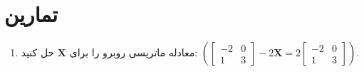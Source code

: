 \section{\textbf{تمارین}}
\label{sec:2.10}
{
    \Large
    \begin{spacing}{1.5}
        \begin{enumerate}[label=\textbf{\arabic*}.]
            \item {معادله ماتریسی روبرو را برای $\textbf{X}$ حل کنید: $\left( \begin{bmatrix}
                                                                                  -2 & 0 \\
                                                                                  1  & 3
            \end{bmatrix}-2\textbf{X}=2\begin{bmatrix}
                                           -2 & 0 \\
                                           1  & 3
            \end{bmatrix} \right)$.}


\end{enumerate}
\end{spacing}}
